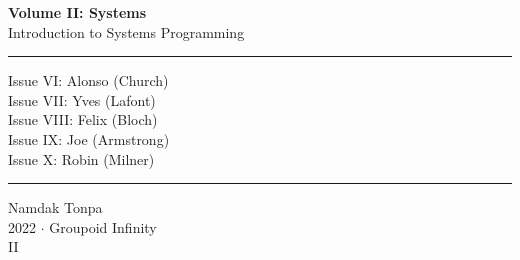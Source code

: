 \documentclass{article}
\begin{document}
\begin{titlepage}
    \centering
    \vspace*{0.5in}
    \Huge
    \textbf{Volume II: Systems} \\
    \LARGE
    Introduction to Systems Programming \\
    \vspace{1.5in}
    \vspace{-2mm} \rule{\textwidth}{0.4pt}
    \flushleft
    \small
    Issue VI: Alonso (Church) \\
    Issue VII: Yves (Lafont) \\
    Issue VIII: Felix (Bloch) \\
    Issue IX: Joe (Armstrong) \\
    Issue X: Robin (Milner) \\
    \vspace{-2mm} \rule{\textwidth}{0.4pt}
    \centering
    \vfill
    \large
    Namdak Tonpa \\
    \Large
    2022 $\cdot$ Groupoid Infinity \\
    II
\end{titlepage}

\tableofcontents
\newif\ifincludeTOC
\includeTOCfalse

\newpage \begin{standalone}  \end{standalone} %
\newpage \begin{standalone}    \end{standalone} %
\newpage \begin{standalone}   \end{standalone} %
\newpage \begin{standalone}     \end{standalone} %
\newpage \begin{standalone}   \end{standalone} %
\end{document}
